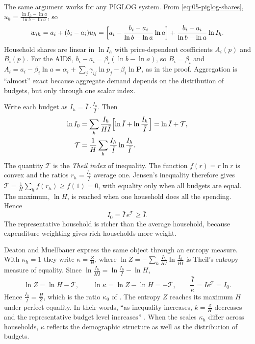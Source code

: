 The same argument works for any PIGLOG system. From \eqref{eq:05-piglog-shares}, $u_h = \frac{\ln I_h -
\ln a}{\ln b - \ln a}$, so
\begin{equation*}
  w_{ih} = a_i + (b_i - a_i)u_h
  = \Bigl[a_i - \frac{b_i - a_i}{\ln b - \ln a}\ln a\Bigr] + \frac{b_i - a_i}{\ln b - \ln a}\ln I_h .
\end{equation*}
Household shares are linear in $\ln I_h$ with price-dependent coefficients $A_i(p)$ and $B_i(p)$. For the
AIDS, $b_i - a_i = \beta_i(\ln b - \ln a)$, so $B_i = \beta_i$ and $A_i = a_i - \beta_i\ln a = \alpha_i +
\sum_j\gamma_{ij}\ln p_j - \beta_i\ln\mathbf{P}$, as in the proof. Aggregation is ``almost'' exact
because aggregate demand depends on the distribution of budgets, but only through one scalar index.

Write each budget as $I_h = \bar I\cdot\frac{I_h}{\bar I}$. Then
\begin{align}
  \ln I_0 &= \sum_h \frac{I_h}{H\bar I}\Bigl[\ln\bar I + \ln\frac{I_h}{\bar I}\Bigr]
           = \ln\bar I + \mathcal{T}, \notag\\
  \mathcal{T} &= \frac{1}{H}\sum_h \frac{I_h}{\bar I}\ln\frac{I_h}{\bar I}. \label{eq:05-theil}
\end{align}
The quantity $\mathcal{T}$ is the \emph{Theil index} of inequality. The function $f(r) = r\ln r$ is
convex and the ratios $r_h = \frac{I_h}{\bar I}$ average one. Jensen's inequality therefore gives
$\mathcal{T} = \frac{1}{H}\sum_h f(r_h) \ge f(1) = 0$, with equality only when all budgets are equal. The
maximum, $\ln H$, is reached when one household does all the spending. Hence
\begin{equation*}
  I_0 = \bar I\, e^{\mathcal{T}} \ge \bar I .
\end{equation*}
The representative household is richer than the average household, because expenditure weighting gives
rich households more weight.

Deaton and Muellbauer express the same object through an entropy measure. With $\kappa_h = 1$ they write
$\kappa = \frac{Z}{H}$, where $\ln Z = -\sum_h \frac{I_h}{H\bar I}\ln\frac{I_h}{H\bar I}$ is Theil's
entropy measure of equality. Since $\ln\frac{I_h}{H\bar I} = \ln\frac{I_h}{\bar I} - \ln H$,
\begin{equation*}
  \ln Z = \ln H - \mathcal{T}, \qquad \ln\kappa = \ln Z - \ln H = -\mathcal{T}, \qquad
  \frac{\bar I}{\kappa} = \bar I e^{\mathcal{T}} = I_0 .
\end{equation*}
Hence $\frac{I_0}{\bar I} = \frac{H}{Z}$, which is the ratio $\kappa_0$ of \citet[\S 6.2, eq.~2.15,
p.~157]{DeatonMuellbauer1980b}. The entropy $Z$ reaches its maximum $H$ under perfect equality. In their words, ``as inequality
increases, $k = \frac{Z}{H}$ decreases and the representative budget level increases''
\citep[p.~315]{DeatonMuellbauer1980a}. When the scales $\kappa_h$ differ across households, $\kappa$
reflects the demographic structure as well as the distribution of budgets.

